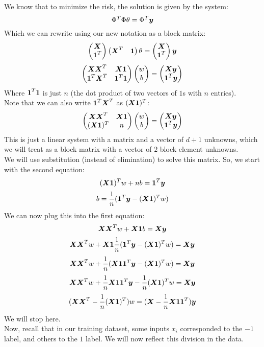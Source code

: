 \documentclass[12pt]{article}
\begin{document}
We know that to minimize the risk,
the solution is given by the system:
\[ \Phi^T\Phi \theta = \Phi^T \boldsymbol{y} \]
Which we can rewrite using our new notation
as a block matrix:
\[ \begin{pmatrix} \boldsymbol{X} \\ \boldsymbol{1}^T \end{pmatrix}\begin{pmatrix} \boldsymbol{X}^T & \boldsymbol{1} \end{pmatrix}
\theta = \begin{pmatrix} \boldsymbol{X} \\ \boldsymbol{1}^T \end{pmatrix}\boldsymbol{y} \]
\[ \begin{pmatrix} \boldsymbol{X}\boldsymbol{X}^T & \boldsymbol{X}\boldsymbol{1} \\ 
\boldsymbol{1}^T\boldsymbol{X}^T & \boldsymbol{1}^T\boldsymbol{1} \end{pmatrix}
\begin{pmatrix} w \\ b \end{pmatrix}= \begin{pmatrix} \boldsymbol{X}\boldsymbol{y} \\ \boldsymbol{1}^T \boldsymbol{y} \end{pmatrix} \]
Where $\boldsymbol{1}^T\boldsymbol{1}$ is just $n$
(the dot product of two vectors of $1$s with $n$
entries). \\
Note that we can also write $\boldsymbol{1}^T\boldsymbol{X}^T$
as $(\boldsymbol{X}\boldsymbol{1})^T$:
\[ \begin{pmatrix} \boldsymbol{X}\boldsymbol{X}^T & \boldsymbol{X}\boldsymbol{1} \\ 
(\boldsymbol{X}\boldsymbol{1})^T & n \end{pmatrix}
\begin{pmatrix} w \\ b \end{pmatrix}= \begin{pmatrix} \boldsymbol{X}\boldsymbol{y} \\ \boldsymbol{1}^T \boldsymbol{y} \end{pmatrix} \]
This is just a linear system with a matrix and a vector
of $d+1$ unknowns, which we will treat as a block matrix
with a vector of $2$ block element unknowns. \\

We will use substitution (instead of elimination)
to solve this matrix. So, we start
with the second equation:
\[ (\boldsymbol{X}\boldsymbol{1})^T w + nb = \boldsymbol{1}^T\boldsymbol{y} \]
\[ b = \dfrac{1}{n}(\boldsymbol{1}^T\boldsymbol{y} - (\boldsymbol{X}\boldsymbol{1})^T w) \]
We can now plug this into the first equation:
\[ \boldsymbol{X}\boldsymbol{X}^T w + \boldsymbol{X}\boldsymbol{1}b = \boldsymbol{X}\boldsymbol{y} \]
\[ \boldsymbol{X}\boldsymbol{X}^T w + \boldsymbol{X}\boldsymbol{1} 
\dfrac{1}{n}(\boldsymbol{1}^T\boldsymbol{y} - (\boldsymbol{X}\boldsymbol{1})^T w)
= \boldsymbol{X}\boldsymbol{y} \]
\[ \boldsymbol{X}\boldsymbol{X}^T w + \dfrac{1}{n}
(\boldsymbol{X}\boldsymbol{1} \boldsymbol{1}^T\boldsymbol{y} - (\boldsymbol{X}\boldsymbol{1})^T w)
= \boldsymbol{X}\boldsymbol{y} \]
\[ \boldsymbol{X}\boldsymbol{X}^T w + \dfrac{1}{n}\boldsymbol{X}\boldsymbol{1} \boldsymbol{1}^T\boldsymbol{y} - 
\dfrac{1}{n}(\boldsymbol{X}\boldsymbol{1})^T w
= \boldsymbol{X}\boldsymbol{y} \]
\[ (\boldsymbol{X}\boldsymbol{X}^T - \dfrac{1}{n}(\boldsymbol{X}\boldsymbol{1})^T) w
= (\boldsymbol{X} - \dfrac{1}{n}\boldsymbol{X}\boldsymbol{1} \boldsymbol{1}^T) \boldsymbol{y} \]
We will stop here. \\

Now, recall that in our training dataset, some inputs
$x_i$ corresponded to the $-1$ label, and others to the
$1$ label.
We will now reflect this division in the data. \\
\end{document}
